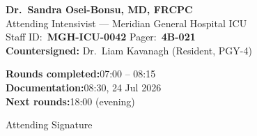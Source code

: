 \documentclass[11pt,a4paper]{scrartcl}
\begin{document}
\vspace{10pt}

\noindent
\begin{tcolorbox}[colframe=MedNavy, colback=MedNavy!3!white, arc=3pt,
  boxrule=0.5pt, left=8pt, right=8pt, top=6pt, bottom=6pt]
  \sffamily\footnotesize
  \noindent
  \begin{minipage}[t]{0.55\linewidth}
    \textbf{\color{MedNavy}\large Dr.\ Sandra Osei-Bonsu, MD, FRCPC}\\[2pt]
    \textcolor{TextGray}{Attending Intensivist — Meridian General Hospital ICU}\\[2pt]
    \textcolor{TextGray}{Staff ID:~\textbf{MGH-ICU-0042}}\quad
    \textcolor{TextGray}{Pager:~\textbf{4B-021}}\\[6pt]
    \noindent\textbf{\color{MedNavy}Countersigned:}\enspace
    Dr.\ Liam Kavanagh (Resident, PGY-4)
  \end{minipage}\hfill
  \begin{minipage}[t]{0.42\linewidth}
    \raggedleft
    \textbf{\color{MedNavy}Rounds completed:}\enspace\textcolor{TextGray}{07:00 -- 08:15}\\[2pt]
    \textbf{\color{MedNavy}Documentation:}\enspace\textcolor{TextGray}{08:30, 24 Jul 2026}\\[2pt]
    \textbf{\color{MedNavy}Next rounds:}\enspace\textcolor{TextGray}{18:00 (evening)}\\[6pt]
    \vspace{8pt}
    \noindent\textcolor{RuleGray}{\hdashrule[0.5ex]{5cm}{0.4pt}{2pt}}\par
    {\footnotesize\color{TextGray}Attending Signature}
  \end{minipage}
\end{tcolorbox}

\vspace{4pt}
\end{document}
